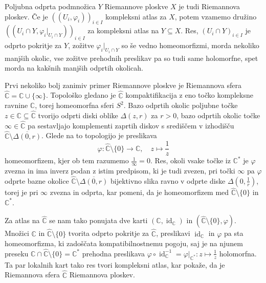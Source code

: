 \documentclass[mat1]{fmfdelo}
\numberwithin{equation}{section}
\newcommand{\C}{\mathbb C}
\newcommand{\CM}{\mathbb C ^*}
\newcommand{\RS}{\widehat{\C}}
\newcommand{\inv}{^{-1}}
\newcommand{\disk}[2]{\Delta(#1, #2)}
\DeclareMathOperator{\id}{id}
\theoremstyle{definition}
\begin{document}
\begin{primer*}
    
    Poljubna odprta podmnožica $Y$ Riemannove ploskve $X$ je tudi Riemannova ploskev. Če je $((U_i, \varphi_i))_{i \in I}$ kompleksni atlas za $X$, potem vzamemo družino $((U_i \cap Y, \varphi_i|_{U_i \cap Y}))_{i \in I}$ za kompleksni atlas na $Y\subseteq X$. Res, $(U_i \cap Y)_{i \in I}$ je odprto pokritje za $Y$, zožitve $\varphi_i|_{U_i \cap Y}$ so še vedno homeomorfizmi, morda nekoliko manjših okolic, vse zožitve prehodnih preslikav pa so tudi same holomorfne, spet morda na kakšnih manjših odprtih okolicah. 
\end{primer*}
    
\begin{primer*}
    Prvi nekoliko bolj zanimiv primer Riemannove ploskve je Riemannova sfera $\RS = \C \cup \{\infty\}$. Topološko gledano je $\RS$ kompaktifikacija z eno točko kompleksne ravnine $\C$, torej homeomorfna sferi $S^2$. Bazo odprtih okolic poljubne točke $z \in \C \subseteq \RS$ tvorijo odprti diski oblike $\disk{z}{r}$ za $r>0$, bazo odprtih okolic točke $\infty \in \RS$ pa sestavljajo komplementi zaprtih diskov s središčem v izhodišču $\RS \setminus \overline{\disk{0}{r}}$. Glede na to topologijo je preslikava
    \[
        \varphi: \RS\setminus\{0\} \to \C, \quad z \mapsto \frac{1}{z}
    \]
    homeomorfizem, kjer ob tem razumemo $\frac{1}{\infty} = 0$. Res, okoli vsake točke iz $\CM$ je $\varphi$ zvezna in ima inverz podan z istim predpisom, ki je tudi zvezen, pri točki $\infty$ pa $\varphi$ odprte bazne okolice $\RS \setminus \overline{\disk{0}{r}}$ bijektivno slika ravno v odprte diske $\disk{0}{\frac{1}{r}}$, torej je pri $\infty$ zvezna in odprta, kar pomeni, da je homeomorfizem med $\RS\setminus\{0\}$ in $\CM$.
    
    Za atlas na $\RS$ se nam tako ponujata dve karti $(\C, \id_\C)$ in $(\RS\setminus\{0\}, \varphi)$. Množici $\C$ in $\RS\setminus\{0\}$ tvorita odprto pokritje za $\RS$, preslikavi $\id_\C$ in $\varphi$ pa sta homeomorfizma, ki zadoščata kompatibilnostnemu pogoju, saj je na njunem preseku $\C \cap \RS\setminus\{0\} = \CM$ prehodna preslikava $\varphi \circ \id_\C\inv = \varphi|_{\CM} : z \mapsto \frac{1}{z}$ holomorfna. Ta par lokalnih kart tako res tvori kompleksni atlas, kar pokaže, da je Riemannova sfera $\RS$ Riemannova ploskev.
\end{primer*}
\end{document}

